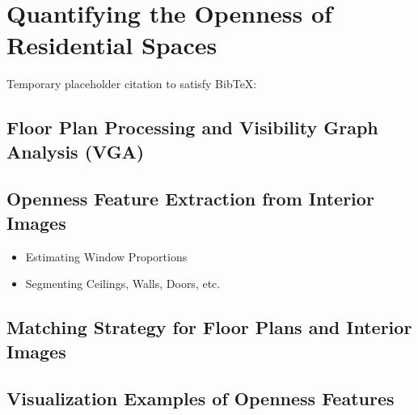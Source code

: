 \chapter{Quantifying the Openness of Residential Spaces}

Temporary placeholder citation to satisfy BibTeX: \cite{dummy2024}

\section{Floor Plan Processing and Visibility Graph Analysis (VGA)}

\section{Openness Feature Extraction from Interior Images}
\begin{itemize}
    \item Estimating Window Proportions
    \item Segmenting Ceilings, Walls, Doors, etc.
\end{itemize}

\section{Matching Strategy for Floor Plans and Interior Images}

\section{Visualization Examples of Openness Features}